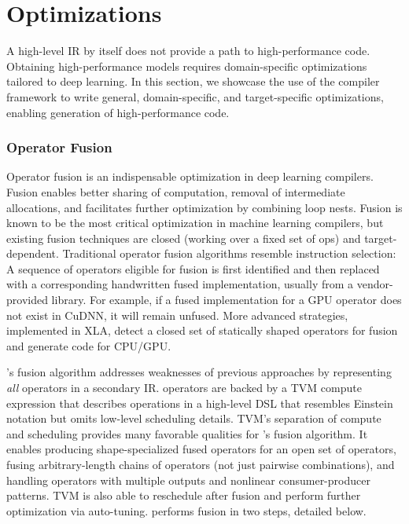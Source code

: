 \chapter{Optimizations}
\label{ch:optimizations}


A high-level IR by itself does not provide a path to high-performance code.
Obtaining high-performance models requires domain-specific
  optimizations tailored to deep learning.
In this section, we showcase the use of the \relay compiler framework
  to write general, domain-specific, and target-specific optimizations,
  enabling generation of high-performance code.

\subsection{Operator Fusion}
\label{sec:fusion}

Operator fusion is an indispensable optimization in deep learning compilers.
Fusion enables better sharing of computation, removal of
  intermediate allocations, and facilitates further optimization by
  combining loop nests.
Fusion is known to be the most critical optimization in machine
  learning compilers, but existing fusion techniques
  are closed (working over a fixed set of ops)
  and target-dependent.
Traditional operator fusion algorithms resemble instruction
  selection:
A sequence of operators eligible
  for fusion is first identified and then replaced with a corresponding
  handwritten fused implementation, usually from a vendor-provided library.
For example, if a fused implementation for a GPU operator does not exist in CuDNN,
  it will remain unfused.
More advanced strategies, implemented in XLA, detect a
  closed set of statically shaped operators for fusion and
  generate code for CPU/GPU.

\relay's fusion algorithm addresses weaknesses of previous approaches by representing
  \textit{all} operators in a secondary IR.
\relay operators are backed by a TVM compute expression that
  describes operations in a high-level DSL that resembles Einstein notation
  but omits low-level scheduling details.
TVM's separation of compute and scheduling provides many favorable qualities
  for \relay's fusion algorithm.
It enables producing shape-specialized fused operators for an open set of operators,
  fusing arbitrary-length chains of operators (not just pairwise combinations),
  and handling operators with multiple outputs and nonlinear consumer-producer patterns.
TVM is also able to reschedule after fusion and perform further optimization via auto-tuning.
\relay performs fusion in two steps, detailed below.

